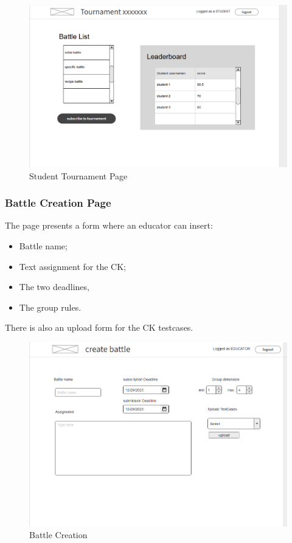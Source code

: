 \begin{figure}[H]
    \centering
    \includegraphics[width=0.7\linewidth]{misc//Images//UI Mockups/studTournament.png}
    \caption{Student Tournament Page}
    \label{fig:enter-label}
\end{figure}
\newpage
\subsubsection{Battle Creation Page}
The page presents a form where an educator can insert: 
\begin{itemize}
    \item Battle name;
    \item Text assignment for the \ac{CK}; 
    \item The two deadlines,
    \item The group rules.
\end{itemize}
There is also an upload form for the \ac{CK} testcases.

\begin{figure}[H]
    \centering
    \includegraphics[width=1\linewidth]{misc//Images//UI Mockups/createBattle.png}
    \caption{Battle Creation}
    \label{fig:enter-label}
\end{figure}
\newpage
